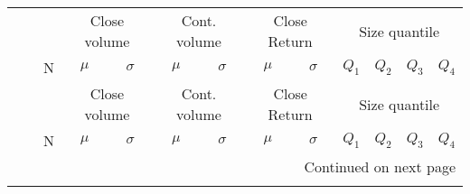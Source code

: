 \documentclass[11pt,a4paper]{article}
\begin{document}
    \begin{doublespacing}
        \begin{small}
            \begin{longtable}{llc|cc|cc|cc|cccc}
                \toprule
                \multicolumn{3}{c}{} & \multicolumn{2}{c}{Close volume} & \multicolumn{2}{c}{Cont. volume} & \multicolumn{2}{c}{Close Return}        & \multicolumn{4}{c}{Size quantile}    \\ \cmidrule{4-5} \cmidrule{6-7} \cmidrule{8-9} \cmidrule{10-13}
                {}  & {}    & N   & $\mu$  & $\sigma$ & $\mu$  & $\sigma$ & $\mu$ & $\sigma$ & $Q_1$ & $Q_2$ & $Q_3$ & $Q_4$ \\
                \midrule
                \endfirsthead

                \toprule
                \multicolumn{3}{c}{} & \multicolumn{2}{c}{Close volume} & \multicolumn{2}{c}{Cont. volume} & \multicolumn{2}{c}{Close Return}        & \multicolumn{4}{c}{Size quantile}  \\  \cmidrule{4-5} \cmidrule{6-7} \cmidrule{8-9} \cmidrule{10-13}
                {}  & {}    & N   & $\mu$  & $\sigma$ & $\mu$  & $\sigma$ & $\mu$ & $\sigma$ & $Q_1$ & $Q_2$ & $Q_3$ & $Q_4$ \\
                \midrule
                \endhead
                \midrule
                \multicolumn{13}{r}{{Continued on next page}} \\
                \midrule
                \endfoot


\end{longtable}
\end{small}
\end{doublespacing}
\end{document}
